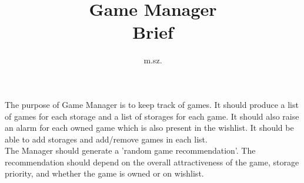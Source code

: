 \documentclass{article}
\title{Game Manager\\ Brief}
\author{m.sz.}
\begin{document}
The purpose of Game Manager is to keep track of games. It should produce a list
of games for each storage and a list of storages for each game. It should also
raise an alarm for each owned game which is also present in the wishlist. It
should be able to add storages and add/remove games in each list.\\
The Manager should generate a 'random game recommendation'. The recommendation
should depend on the overall attractiveness of the game, storage priority, and 
whether the game is owned or on wishlist.
\end{document}
